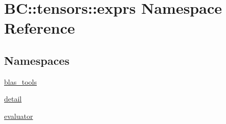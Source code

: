 \hypertarget{namespaceBC_1_1tensors_1_1exprs}{}\section{BC\+:\+:tensors\+:\+:exprs Namespace Reference}
\label{namespaceBC_1_1tensors_1_1exprs}
\subsection*{Namespaces}
\begin{DoxyCompactItemize}
\item 
 \hyperlink{namespaceBC_1_1tensors_1_1exprs_1_1blas__tools}{blas\+\_\+tools}
\item 
 \hyperlink{namespaceBC_1_1tensors_1_1exprs_1_1detail}{detail}
\item 
 \hyperlink{namespaceBC_1_1tensors_1_1exprs_1_1evaluator}{evaluator}
\end{DoxyCompactItemize}
